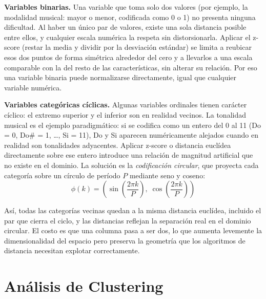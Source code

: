 \textbf{Variables binarias.} Una variable que toma solo dos valores (por ejemplo, la modalidad musical: mayor o menor, codificada como 0 o 1) no presenta ninguna dificultad. Al haber un único par de valores, existe una sola distancia posible entre ellos, y cualquier escala numérica la respeta sin distorsionarla. Aplicar el z-score (restar la media y dividir por la desviación estándar) se limita a reubicar esos dos puntos de forma simétrica alrededor del cero y a llevarlos a una escala comparable con la del resto de las características, sin alterar su relación. Por eso una variable binaria puede normalizarse directamente, igual que cualquier variable numérica.

\textbf{Variables categóricas cíclicas.} Algunas variables ordinales tienen carácter cíclico: el extremo superior y el inferior son en realidad vecinos. La tonalidad musical es el ejemplo paradigmático: si se codifica como un entero del 0 al 11 (Do = 0, Do\# = 1, \ldots, Si = 11), Do y Si aparecen numéricamente alejados cuando en realidad son tonalidades adyacentes. Aplicar z-score o distancia euclídea directamente sobre ese entero introduce una relación de magnitud artificial que no existe en el dominio. La solución es la \textit{codificación circular}, que proyecta cada categoría sobre un círculo de período $P$ mediante seno y coseno:
\begin{equation}
    \phi(k) = \left( \sin\!\left(\frac{2\pi k}{P}\right),\; \cos\!\left(\frac{2\pi k}{P}\right) \right)
    \label{eq:circular-teo}
\end{equation}

Así, todas las categorías vecinas quedan a la misma distancia euclídea, incluido el par que cierra el ciclo, y las distancias reflejan la separación real en el dominio circular. El costo es que una columna pasa a ser dos, lo que aumenta levemente la dimensionalidad del espacio pero preserva la geometría que los algoritmos de distancia necesitan explotar correctamente.


\section{Análisis de Clustering}
\label{sec:clustering-teoria}


